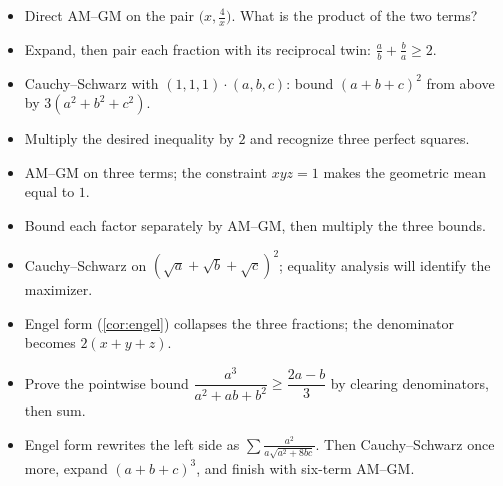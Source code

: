 
\begin{itemize}[leftmargin=2.2em, itemsep=5pt, label={}]
  \item[\textbf{1.}] Direct AM--GM on the pair $\big(x, \tfrac{4}{x}\big)$.
    What is the product of the two terms?
  \item[\textbf{2.}] Expand, then pair each fraction with its
    reciprocal twin: $\tfrac{a}{b} + \tfrac{b}{a} \ge 2$.
  \item[\textbf{3.}] Cauchy--Schwarz with
    $(1, 1, 1) \cdot (a, b, c)$: bound $(a+b+c)^2$ from above by
    $3(a^2+b^2+c^2)$.
  \item[\textbf{4.}] Multiply the desired inequality by $2$ and
    recognize three perfect squares.
  \item[\textbf{5.}] AM--GM on three terms; the constraint $xyz = 1$
    makes the geometric mean equal to $1$.
  \item[\textbf{6.}] Bound each factor separately by AM--GM, then
    multiply the three bounds.
  \item[\textbf{7.}] Cauchy--Schwarz on
    $(\sqrt a + \sqrt b + \sqrt c)^2$; equality analysis will
    identify the maximizer.
  \item[\textbf{8.}] Engel form (\cref{cor:engel}) collapses the
    three fractions; the denominator becomes $2(x+y+z)$.
  \item[\textbf{C1.}] Prove the pointwise bound
    $\dfrac{a^3}{a^2+ab+b^2} \ge \dfrac{2a-b}{3}$
    by clearing denominators, then sum.
  \item[\textbf{C2.}] Engel form rewrites the left side as
    $\sum \frac{a^2}{a\sqrt{a^2+8bc}}$. Then Cauchy--Schwarz once
    more, expand $(a+b+c)^3$, and finish with six-term AM--GM.
\end{itemize}
